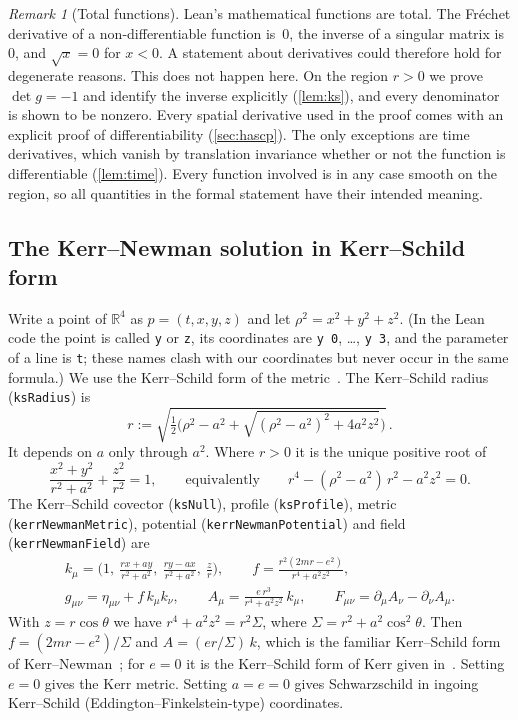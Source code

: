\documentclass[11pt]{article}
\theoremstyle{definition}
\theoremstyle{remark}
\newtheorem{remark}[theorem]{Remark}
\newcommand{\R}{\mathbb{R}}
\newcommand{\lean}[1]{\lstinline[basicstyle=\ttfamily\normalsize,columns=fullflexible,breaklines=false]{#1}}
\begin{document}
\begin{remark}[Total functions]\label{rem:junk}
Lean's mathematical functions are total.
The Fr\'echet derivative of a non-differentiable function is~$0$, the inverse of a singular matrix is~$0$, and $\sqrt{x}=0$ for $x<0$.
A statement about derivatives could therefore hold for degenerate reasons.
This does not happen here.
On the region $r>0$ we prove $\det g=-1$ and identify the inverse explicitly (\cref{lem:ks}), and every denominator is shown to be nonzero.
Every spatial derivative used in the proof comes with an explicit proof of differentiability (\cref{sec:hascp}).
The only exceptions are time derivatives, which vanish by translation invariance whether or not the function is differentiable (\cref{lem:time}).
Every function involved is in any case smooth on the region, so all quantities in the formal statement have their intended meaning.
\end{remark}

\subsection{The Kerr--Newman solution in Kerr--Schild form}\label{sec:kn}

Write a point of $\R^4$ as $p=(t,x,y,z)$ and let $\rho^2=x^2+y^2+z^2$. (In the Lean code the point is called \lean{y} or \lean{z}, its coordinates are \lean{y 0}, \ldots, \lean{y 3}, and the parameter of a line is \lean{t}; these names clash with our coordinates but never occur in the same formula.)
We use the Kerr--Schild form of the metric~\cite{kerrschild1965atti,kerrschild2009}.
The Kerr--Schild radius (\lean{ksRadius}) is
\begin{equation}\label{eq:r}
  r := \sqrt{\tfrac12\Big(\rho^2-a^2+\sqrt{(\rho^2-a^2)^2+4a^2z^2}\Big)}\,.
\end{equation}
It depends on $a$ only through $a^2$. Where $r>0$ it is the unique positive root of
\begin{equation}\label{eq:quartic}
  \frac{x^2+y^2}{r^2+a^2}+\frac{z^2}{r^2}=1,
  \qquad\text{equivalently}\qquad
  r^4-(\rho^2-a^2)\,r^2-a^2z^2=0 .
\end{equation}
The Kerr--Schild covector (\lean{ksNull}), profile (\lean{ksProfile}), metric (\lean{kerrNewmanMetric}), potential (\lean{kerrNewmanPotential}) and field (\lean{kerrNewmanField}) are
\begin{gather}
  k_\mu = \Big(1,\ \frac{rx+ay}{r^2+a^2},\ \frac{ry-ax}{r^2+a^2},\ \frac{z}{r}\Big),\qquad
  f=\frac{r^2(2mr-e^2)}{r^4+a^2z^2},\label{eq:kf}\\
  g_{\mu\nu}=\eta_{\mu\nu}+f\,k_\mu k_\nu,\qquad
  A_\mu=\frac{e\,r^3}{r^4+a^2z^2}\,k_\mu,\qquad
  F_{\mu\nu}=\partial_\mu A_\nu-\partial_\nu A_\mu.\label{eq:gA}
\end{gather}
With $z=r\cos\theta$ we have $r^4+a^2z^2=r^2\Sigma$, where $\Sigma=r^2+a^2\cos^2\theta$.
Then $f=(2mr-e^2)/\Sigma$ and $A=(er/\Sigma)\,k$, which is the familiar Kerr--Schild form of Kerr--Newman~\cite{debney1969,adamo2014}; for $e=0$ it is the Kerr--Schild form of Kerr given in~\cite{visser2009}.
Setting $e=0$ gives the Kerr metric.
Setting $a=e=0$ gives Schwarzschild in ingoing Kerr--Schild (Eddington--Finkelstein-type) coordinates.
\end{document}

